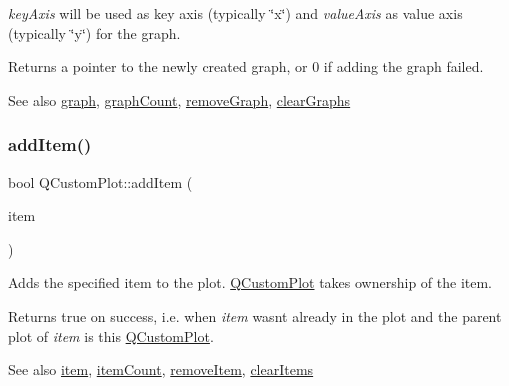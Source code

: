 {\itshape key\+Axis} will be used as key axis (typically \char`\"{}x\char`\"{}) and {\itshape value\+Axis} as value axis (typically \char`\"{}y\char`\"{}) for the graph.

Returns a pointer to the newly created graph, or 0 if adding the graph failed.

\begin{DoxySeeAlso}{See also}
\mbox{\hyperlink{class_q_custom_plot_a6ecae130f684b25276fb47bd3a5875c6}{graph}}, \mbox{\hyperlink{class_q_custom_plot_a5e1787cdde868c4d3790f9ebc8207d90}{graph\+Count}}, \mbox{\hyperlink{class_q_custom_plot_a903561be895fb6528a770d66ac5e6713}{remove\+Graph}}, \mbox{\hyperlink{class_q_custom_plot_ab0f3abff2d2f7df3668b5836f39207fa}{clear\+Graphs}} 
\end{DoxySeeAlso}
\mbox{\label{class_q_custom_plot_aa500620379262321685cb7a7674cbd2a}} 
\subsubsection{\texorpdfstring{add\+Item()}{addItem()}}
{\footnotesize\ttfamily bool Q\+Custom\+Plot\+::add\+Item (\begin{DoxyParamCaption}\item[{\mbox{\hyperlink{class_q_c_p_abstract_item}{Q\+C\+P\+Abstract\+Item}} $\ast$}]{item }\end{DoxyParamCaption})}

Adds the specified item to the plot. \mbox{\hyperlink{class_q_custom_plot}{Q\+Custom\+Plot}} takes ownership of the item.

Returns true on success, i.\+e. when {\itshape item} wasn\textquotesingle{}t already in the plot and the parent plot of {\itshape item} is this \mbox{\hyperlink{class_q_custom_plot}{Q\+Custom\+Plot}}.

\begin{DoxySeeAlso}{See also}
\mbox{\hyperlink{class_q_custom_plot_ac042f2e78edd228ccf2f26b7fe215239}{item}}, \mbox{\hyperlink{class_q_custom_plot_a16025daf0341f9362be3080e404424c2}{item\+Count}}, \mbox{\hyperlink{class_q_custom_plot_ae04446557292551e8fb6e2c106e1848d}{remove\+Item}}, \mbox{\hyperlink{class_q_custom_plot_abdfd07d4f0591d0cf967f85013fd3645}{clear\+Items}} 
\end{DoxySeeAlso}
\mbox{\label{class_q_custom_plot_ad5255393df078448bb6ac83fa5db5f52}} 
